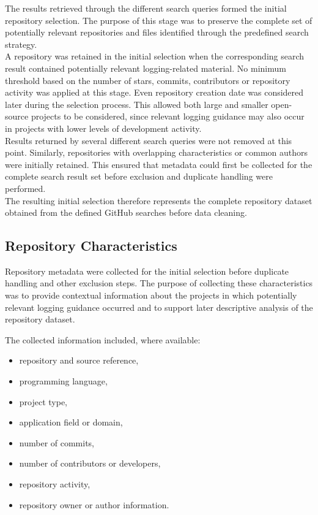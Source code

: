 The results retrieved through the different search queries formed the initial
repository selection. The purpose of this stage was to preserve the complete set of
potentially relevant repositories and files identified through the predefined search
strategy.
\\
A repository was retained in the initial selection when the corresponding search
result contained potentially relevant logging-related material. No minimum threshold
based on the number of stars, commits, contributors or repository activity was applied
at this stage. Even repository creation date was considered later during the selection process.
This allowed both large and smaller open-source projects to be considered,
since relevant logging guidance may also occur in projects with lower levels of
development activity.
\\
Results returned by several different search queries were not removed at this point.
Similarly, repositories with overlapping characteristics or common authors were
initially retained. This ensured that metadata could first be collected for the complete
search result set before exclusion and duplicate handling were performed.
\\
The resulting initial selection therefore represents the complete repository dataset
obtained from the defined GitHub searches before data cleaning.

\subsection{Repository Characteristics}

Repository metadata were collected for the initial selection before duplicate
handling and other exclusion steps. The purpose of collecting these
characteristics was to provide contextual information about the projects in which
potentially relevant logging guidance occurred and to support later descriptive
analysis of the repository dataset.

The collected information included, where available:

\begin{itemize}
    \item repository and source reference,
    \item programming language,
    \item project type,
    \item application field or domain,
    \item number of commits,
    \item number of contributors or developers,
    \item repository activity,
    \item repository owner or author information.
\end{itemize}

